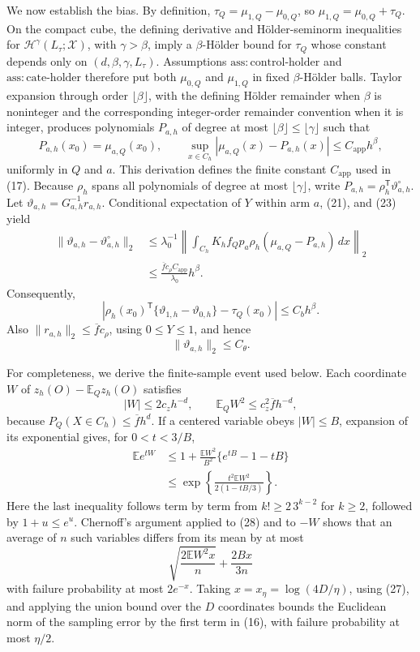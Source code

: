 We now establish the bias.  By definition, \(\tau_Q=\mu_{1,Q}-\mu_{0,Q}\), so \(\mu_{1,Q}=\mu_{0,Q}+\tau_Q\).  On the compact cube, the defining derivative and H\"older-seminorm inequalities for \(\mathcal H^\gamma(L_\tau;\mathcal X)\), with \(\gamma>\beta\), imply a \(\beta\)-H\"older bound for \(\tau_Q\) whose constant depends only on \((d,\beta,\gamma,L_\tau)\).  Assumptions \(\mathrm{ass{:}control\text{-}holder}\) and \(\mathrm{ass{:}cate\text{-}holder}\) therefore put both \(\mu_{0,Q}\) and \(\mu_{1,Q}\) in fixed \(\beta\)-H\"older balls.  Taylor expansion through order \(\lfloor\beta\rfloor\), with the defining H\"older remainder when \(\beta\) is noninteger and the corresponding integer-order remainder convention when it is integer, produces polynomials \(P_{a,h}\) of degree at most \(\lfloor\beta\rfloor\le\lfloor\gamma\rfloor\) such that
\[
 P_{a,h}(x_0)=\mu_{a,Q}(x_0),
 \qquad
 \sup_{x\in C_h}|\mu_{a,Q}(x)-P_{a,h}(x)|
 \le C_{\mathrm{app}}h^\beta,
\tag{23}
\]
uniformly in \(Q\) and \(a\).  This derivation defines the finite constant \(C_{\mathrm{app}}\) used in (17).  Because \(\rho_h\) spans all polynomials of degree at most \(\lfloor\gamma\rfloor\), write \(P_{a,h}=\rho_h^{\mathsf T}\vartheta_{a,h}^\circ\).  Let \(\vartheta_{a,h}=G_{a,h}^{-1}r_{a,h}\).  Conditional expectation of \(Y\) within arm \(a\), (21), and (23) yield
\[
 \begin{aligned}
 \|\vartheta_{a,h}-\vartheta_{a,h}^\circ\|_2
 &\le\lambda_0^{-1}
 \left\|\int_{C_h}K_hf_Qp_a\rho_h(\mu_{a,Q}-P_{a,h})\,dx\right\|_2\\
 &\le \frac{\overline f c_\rho C_{\mathrm{app}}}{\lambda_0}h^\beta.
 \end{aligned}
\tag{24}
\]
Consequently,
\[
 \left|\rho_h(x_0)^{\mathsf T}
 \{\vartheta_{1,h}-\vartheta_{0,h}\}-\tau_Q(x_0)\right|
 \le C_bh^\beta.
\tag{25}
\]
Also \(\|r_{a,h}\|_2\le\overline f c_\rho\), using \(0\le Y\le1\), and hence
\[
 \|\vartheta_{a,h}\|_2\le C_\theta.
\tag{26}
\]

For completeness, we derive the finite-sample event used below.  Each coordinate \(W\) of \(z_h(O)-\mathbb E_Qz_h(O)\) satisfies
\[
 |W|\le2c_zh^{-d},
 \qquad
 \mathbb E_QW^2\le c_z^2\overline f h^{-d},
\tag{27}
\]
because \(P_Q(X\in C_h)\le\overline f h^d\).  If a centered variable obeys \(|W|\le B\), expansion of its exponential gives, for \(0<t<3/B\),
\[
 \begin{aligned}
 \mathbb E e^{tW}
 &\le1+\frac{\mathbb EW^2}{B^2}\{e^{tB}-1-tB\}\\
 &\le\exp\left\{\frac{t^2\mathbb EW^2}{2(1-tB/3)}\right\}.
 \end{aligned}
\tag{28}
\]
Here the last inequality follows term by term from \(k!\ge2\,3^{k-2}\) for \(k\ge2\), followed by \(1+u\le e^u\).  Chernoff's argument applied to (28) and to \(-W\) shows that an average of \(n\) such variables differs from its mean by at most
\[
 \sqrt{\frac{2\mathbb EW^2x}{n}}+\frac{2Bx}{3n}
\tag{29}
\]
with failure probability at most \(2e^{-x}\).  Taking \(x=x_\eta=\log(4D/\eta)\), using (27), and applying the union bound over the \(D\) coordinates bounds the Euclidean norm of the sampling error by the first term in (16), with failure probability at most \(\eta/2\).


